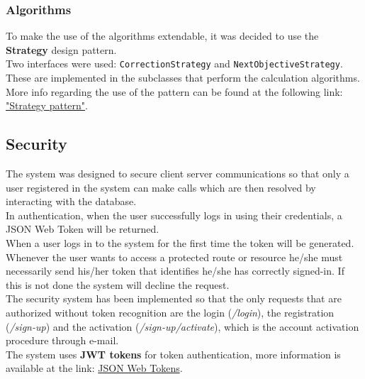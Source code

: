 \subsubsection{Algorithms}
To make the use of the algorithms extendable, it was decided to use the \textbf{Strategy} design pattern.\\
Two interfaces were used: \texttt{CorrectionStrategy} and \texttt{NextObjectiveStrategy}. These are implemented in the subclasses that perform the calculation algorithms.\\
More info regarding the use of the pattern can be found at the following link: \href{https://en.wikipedia.org/wiki/Strategy_pattern}{"Strategy pattern"}.


\subsection{Security}
The system was designed to secure client server communications so that only a user registered in the system can make calls which are then resolved by interacting with the database.\\
In authentication, when the user successfully logs in using their credentials, a JSON Web Token will be returned.\\
When a user logs in to the system for the first time the token will be generated.\\
Whenever the user wants to access a protected route or resource he/she must necessarily send his/her token that identifies he/she has correctly signed-in. If this is not done the system will decline the request.\\
The security system has been implemented so that the only requests that are authorized without token recognition are the login (\textit{/login}), the registration (\textit{/sign-up}) and the activation (\textit{/sign-up/activate}), which is the account activation procedure through e-mail.\\
The system uses \textbf{JWT tokens} for token authentication, more information is available at the link: \href{https://jwt.io/introduction/}{JSON Web Tokens}.

